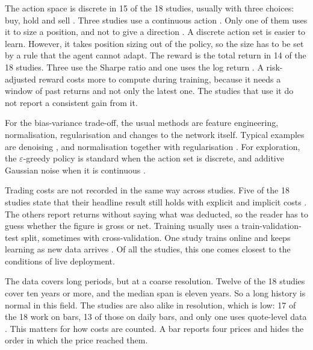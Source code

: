 The action space is discrete in 15 of the 18 studies, usually with three choices: buy, hold and sell \cite{rundo_deep_2019, saini_stock_2019, xiong_practical_2018}. Three studies use a continuous action \cite{majidi_algorithmic_2022, jia_lstm-ddpg_2021, zhang_deep_2020}. Only one of them uses it to size a position, and not to give a direction \cite{jia_lstm-ddpg_2021}. A discrete action set is easier to learn. However, it takes position sizing out of the policy, so the size has to be set by a rule that the agent cannot adapt. The reward is the total return in 14 of the 18 studies. Three use the Sharpe ratio \cite{kong_empirical_2023, sagiraju_application_2021, jia_lstm-ddpg_2021} and one uses the log return \cite{majidi_algorithmic_2022}. A risk-adjusted reward costs more to compute during training, because it needs a window of past returns and not only the latest one. The studies that use it do not report a consistent gain from it.

For the bias-variance trade-off, the usual methods are feature engineering, normalisation, regularisation and changes to the network itself. Typical examples are denoising \cite{li_deep_2019}, and normalisation together with regularisation \cite{theate_application_2021}. For exploration, the \(\varepsilon\)-greedy policy is standard when the action set is discrete, and additive Gaussian noise when it is continuous \cite{wu_adaptive_2020, majidi_algorithmic_2022}.

Trading costs are not recorded in the same way across studies. Five of the 18 studies state that their headline result still holds with explicit and implicit costs \cite{huang_financial_2018, gran_deep_2019, yang_deep_2020, jia_lstm-ddpg_2021, zhang_deep_2020}. The others report returns without saying what was deducted, so the reader has to guess whether the figure is gross or net. Training usually uses a train-validation-test split, sometimes with cross-validation. One study trains online and keeps learning as new data arrives \cite{huang_financial_2018}. Of all the studies, this one comes closest to the conditions of live deployment.

The data covers long periods, but at a coarse resolution. Twelve of the 18 studies cover ten years or more, and the median span is eleven years. So a long history is normal in this field. The studies are also alike in resolution, which is low: 17 of the 18 work on bars, 13 of those on daily bars, and only one uses quote-level data \cite{carapuco_reinforcement_2018}. This matters for how costs are counted. A bar reports four prices and hides the order in which the price reached them.